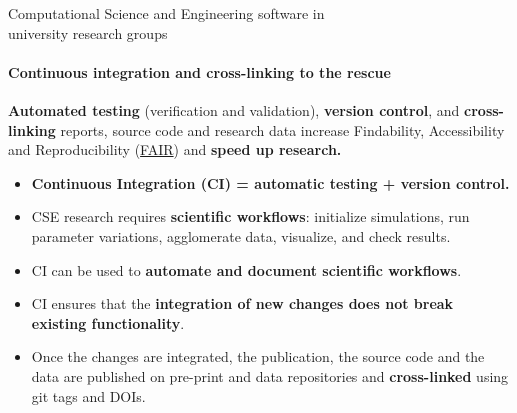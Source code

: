 %
%
%    
%
%

\begin{frame}{Computational Science and Engineering software in\\university research groups}
    \framesubtitle{Continuous integration and cross-linking to the rescue}
    \vfill

    \textbf{Automated testing} (verification and validation), \textbf{version control}, and \textbf{cross-linking} reports, source code and research data increase Findability, Accessibility and Reproducibility (\href{ https://www.go-fair.org/fair-principles}{FAIR}) and \textbf{speed up research.} 

    \begin{itemize}

        \item \textbf{Continuous Integration (CI) = automatic testing + version control.}

        \item CSE research requires \textbf{scientific workflows}: initialize simulations, run parameter variations, agglomerate data, visualize, and check results.  
        \item CI can be used to \textbf{automate and document scientific workflows}. 
        \item CI ensures that the \textbf{integration of new changes does not break existing functionality}.
        \item Once the changes are integrated, the publication, the source code and the data are published on pre-print and data repositories and \textbf{cross-linked} using git tags and DOIs. 
    \end{itemize}

\end{frame}

